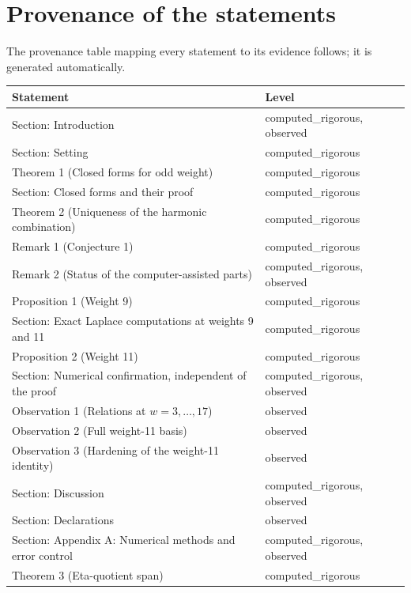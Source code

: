 \documentclass[10pt,twocolumn]{article}
\theoremstyle{definition}\newtheorem{definition}{Definition}\newtheorem{example}{Example}
\begin{document}
\section{Provenance of the statements}\label{provenance-of-the-statements}

The provenance table mapping every statement to its evidence follows; it is generated automatically.

{\def\LTcaptype{none} %
\begin{table}[t]\centering\footnotesize
\begin{tabular}{@{}
  >{\raggedright\arraybackslash}p{}
  >{\raggedright\arraybackslash}p{}@{}}
\toprule
\begin{minipage}[b]{\linewidth}\raggedright
Statement
\end{minipage} & \begin{minipage}[b]{\linewidth}\raggedright
Level
\end{minipage} \\
\midrule
Section: Introduction & computed\_rigorous, observed \\
Section: Setting & computed\_rigorous \\
Theorem 1 (Closed forms for odd weight) & computed\_rigorous \\
Section: Closed forms and their proof & computed\_rigorous \\
Theorem 2 (Uniqueness of the harmonic combination) & computed\_rigorous \\
Remark 1 (Conjecture 1) & computed\_rigorous \\
Remark 2 (Status of the computer-assisted parts) & computed\_rigorous, observed \\
Proposition 1 (Weight 9) & computed\_rigorous \\
Section: Exact Laplace computations at weights 9 and 11 & computed\_rigorous \\
Proposition 2 (Weight 11) & computed\_rigorous \\
Section: Numerical confirmation, independent of the proof & computed\_rigorous, observed \\
Observation 1 (Relations at \(w=3,\dots,17\)) & observed \\
Observation 2 (Full weight-11 basis) & observed \\
Observation 3 (Hardening of the weight-11 identity) & observed \\
Section: Discussion & computed\_rigorous, observed \\
Section: Declarations & observed \\
Section: Appendix A: Numerical methods and error control & computed\_rigorous, observed \\
Theorem 3 (Eta-quotient span) & computed\_rigorous \\
\bottomrule
\end{tabular}
\end{table}

}
\end{document}
